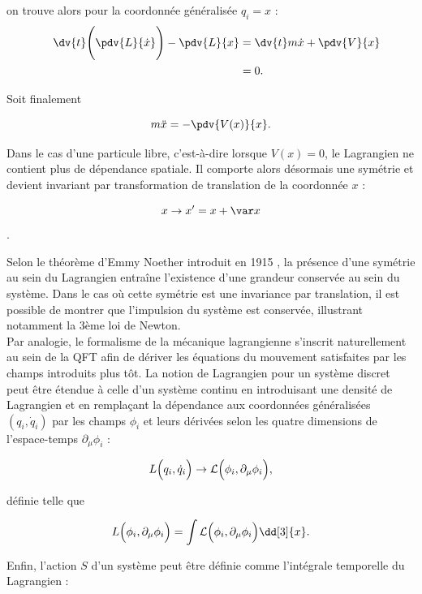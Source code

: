         on trouve alors pour la coordonnée généralisée $q_i=x$ :
        \begin{equation*}
        \begin{split}
            \quad \dv{t}\Biggl(\pdv{L}{\dot x}\Biggr)-\pdv{L}{x} & = \dv{t}m\dot x + \pdv{V}{x} \\
            & = 0.
        \end{split}
        \end{equation*}

        Soit finalement

        \begin{equation}
            m\ddot x = -\pdv{V(x)}{x}.
        \end{equation}

        Dans le cas d'une particule libre, c'est-à-dire lorsque $V(x)=0$, le Lagrangien ne contient plus de dépendance spatiale. Il comporte alors désormais une symétrie et devient invariant par transformation de translation de la coordonnée $x$ :

        $$x\rightarrow x' = x+\var x$$.

        Selon le théorème d'Emmy Noether introduit en 1915 \cite{Noether1918}, la présence d'une symétrie au sein du Lagrangien entraîne l'existence d'une grandeur conservée au sein du système. Dans le cas où cette symétrie est une invariance par translation, il est possible de montrer que l'impulsion du système est conservée, illustrant notamment la 3ème loi de Newton. \\

        Par analogie, le formalisme de la mécanique lagrangienne s'inscrit naturellement au sein de la QFT afin de dériver les équations du mouvement satisfaites par les champs introduits plus tôt. La notion de Lagrangien pour un système discret peut être étendue à celle d'un système continu en introduisant une densité de Lagrangien et en remplaçant la dépendance aux coordonnées généralisées $(q_i,\dot q_i)$ par les champs $\phi_i$ et leurs dérivées selon les quatre dimensions de l'espace-temps $\partial_{\mu}\phi_i$ :

        $$L\Bigl(q_i,\dot q_i\Bigr)\rightarrow\mathcal{L}\Bigl(\phi_i,\partial_{\mu}\phi_i\Bigr),$$

        définie telle que 
        
        $$L\Bigl(\phi_i,\partial_{\mu}\phi_i\Bigr)=\int\mathcal{L}\Bigl(\phi_i,\partial_{\mu}\phi_i\Bigr)\dd[3]{x}.$$

        Enfin, l'action $S$ d'un système peut être définie comme l'intégrale temporelle du Lagrangien :

